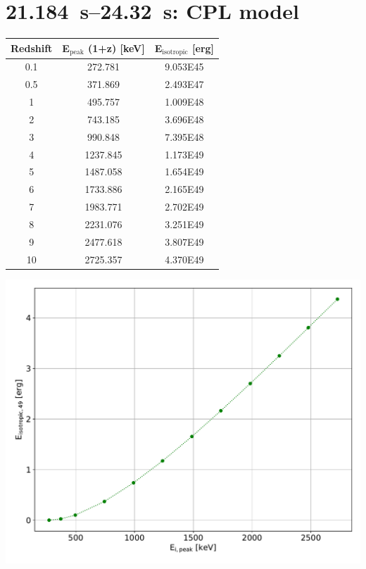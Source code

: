 \documentclass[10pt,report]{article}
\begin{document}

	\section{\SIrange{21.184}{24.32}{\second}: CPL model}
	\begin{minipage}[l]{0.48\textwidth}
		\centering
		\begin{tabular}{ccc}
			\toprule
			Redshift & E$_\text{peak}$ (1+z) [keV]& E$_\text{isotropic}$ [erg] \\
			\midrule
			0.1 & 272.781 & \num{9.053E45}\\
			0.5 & 371.869 & \num{2.493E47}\\
			1 & 495.757 & \num{1.009E48}\\
			2 & 743.185 & \num{3.696E48}\\
			3 & 990.848 & \num{7.395E48}\\
			4 & 1237.845 & \num{1.173E49}\\
			5 & 1487.058 & \num{1.654E49}\\
			6 & 1733.886 & \num{2.165E49}\\
			7 & 1983.771 & \num{2.702E49}\\
			8 & 2231.076 & \num{3.251E49}\\
			9 & 2477.618 & \num{3.807E49}\\
			10 & 2725.357 & \num{4.370E49}\\
			\bottomrule
		\end{tabular}
	\end{minipage}
	\hfill
	\begin{minipage}[r]{0.48\textwidth}
		\centering
		\includegraphics[width=\textwidth]{../ep3/Ep3__eipeak_eisotropic}%
	\end{minipage}%
\end{document}
